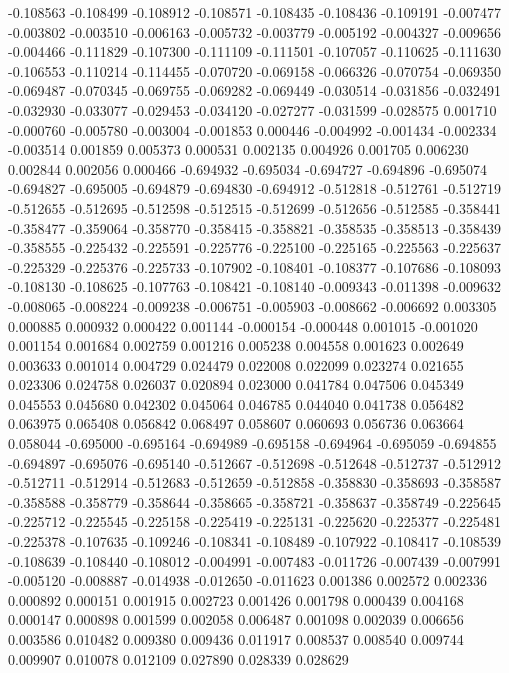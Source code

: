 -0.108563
-0.108499
-0.108912
-0.108571
-0.108435
-0.108436
-0.109191
-0.007477
-0.003802
-0.003510
-0.006163
-0.005732
-0.003779
-0.005192
-0.004327
-0.009656
-0.004466
-0.111829
-0.107300
-0.111109
-0.111501
-0.107057
-0.110625
-0.111630
-0.106553
-0.110214
-0.114455
-0.070720
-0.069158
-0.066326
-0.070754
-0.069350
-0.069487
-0.070345
-0.069755
-0.069282
-0.069449
-0.030514
-0.031856
-0.032491
-0.032930
-0.033077
-0.029453
-0.034120
-0.027277
-0.031599
-0.028575
0.001710
-0.000760
-0.005780
-0.003004
-0.001853
0.000446
-0.004992
-0.001434
-0.002334
-0.003514
0.001859
0.005373
0.000531
0.002135
0.004926
0.001705
0.006230
0.002844
0.002056
0.000466
-0.694932
-0.695034
-0.694727
-0.694896
-0.695074
-0.694827
-0.695005
-0.694879
-0.694830
-0.694912
-0.512818
-0.512761
-0.512719
-0.512655
-0.512695
-0.512598
-0.512515
-0.512699
-0.512656
-0.512585
-0.358441
-0.358477
-0.359064
-0.358770
-0.358415
-0.358821
-0.358535
-0.358513
-0.358439
-0.358555
-0.225432
-0.225591
-0.225776
-0.225100
-0.225165
-0.225563
-0.225637
-0.225329
-0.225376
-0.225733
-0.107902
-0.108401
-0.108377
-0.107686
-0.108093
-0.108130
-0.108625
-0.107763
-0.108421
-0.108140
-0.009343
-0.011398
-0.009632
-0.008065
-0.008224
-0.009238
-0.006751
-0.005903
-0.008662
-0.006692
0.003305
0.000885
0.000932
0.000422
0.001144
-0.000154
-0.000448
0.001015
-0.001020
0.001154
0.001684
0.002759
0.001216
0.005238
0.004558
0.001623
0.002649
0.003633
0.001014
0.004729
0.024479
0.022008
0.022099
0.023274
0.021655
0.023306
0.024758
0.026037
0.020894
0.023000
0.041784
0.047506
0.045349
0.045553
0.045680
0.042302
0.045064
0.046785
0.044040
0.041738
0.056482
0.063975
0.065408
0.056842
0.068497
0.058607
0.060693
0.056736
0.063664
0.058044
-0.695000
-0.695164
-0.694989
-0.695158
-0.694964
-0.695059
-0.694855
-0.694897
-0.695076
-0.695140
-0.512667
-0.512698
-0.512648
-0.512737
-0.512912
-0.512711
-0.512914
-0.512683
-0.512659
-0.512858
-0.358830
-0.358693
-0.358587
-0.358588
-0.358779
-0.358644
-0.358665
-0.358721
-0.358637
-0.358749
-0.225645
-0.225712
-0.225545
-0.225158
-0.225419
-0.225131
-0.225620
-0.225377
-0.225481
-0.225378
-0.107635
-0.109246
-0.108341
-0.108489
-0.107922
-0.108417
-0.108539
-0.108639
-0.108440
-0.108012
-0.004991
-0.007483
-0.011726
-0.007439
-0.007991
-0.005120
-0.008887
-0.014938
-0.012650
-0.011623
0.001386
0.002572
0.002336
0.000892
0.000151
0.001915
0.002723
0.001426
0.001798
0.000439
0.004168
0.000147
0.000898
0.001599
0.002058
0.006487
0.001098
0.002039
0.006656
0.003586
0.010482
0.009380
0.009436
0.011917
0.008537
0.008540
0.009744
0.009907
0.010078
0.012109
0.027890
0.028339
0.028629
